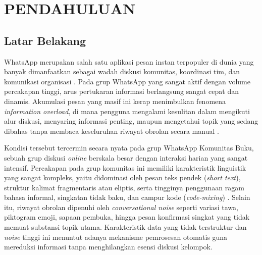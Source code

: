%

\chapter{PENDAHULUAN}

\section{Latar Belakang}
\label{sec:intro-background}

WhatsApp merupakan salah satu aplikasi pesan instan terpopuler di dunia yang banyak dimanfaatkan sebagai wadah diskusi komunitas, koordinasi tim, dan komunikasi organisasi \citep{WhatsAppAbout}.
Pada grup WhatsApp yang sangat aktif dengan volume percakapan tinggi, arus pertukaran informasi berlangsung sangat cepat dan dinamis.
Akumulasi pesan yang masif ini kerap menimbulkan fenomena \textit{information overload}, di mana pengguna mengalami kesulitan dalam mengikuti alur diskusi, menyaring informasi penting, maupun mengetahui topik yang sedang dibahas tanpa membaca keseluruhan riwayat obrolan secara manual \citep{rani2022whatsapp}.

Kondisi tersebut tercermin secara nyata pada grup WhatsApp Komunitas Buku, sebuah grup diskusi \textit{online} berskala besar dengan interaksi harian yang sangat intensif.
Percakapan pada grup komunitas ini memiliki karakteristik linguistik yang sangat kompleks, yaitu didominasi oleh pesan teks pendek (\textit{short text}), struktur kalimat fragmentaris atau eliptis, serta tingginya penggunaan ragam bahasa informal, singkatan tidak baku, dan campur kode (\textit{code-mixing}) \citep{10.1145/3507900,9243443,sutarma2017,siregar2025}.
Selain itu, riwayat obrolan dipenuhi oleh \textit{conversational noise} seperti variasi tawa, piktogram emoji, sapaan pembuka, hingga pesan konfirmasi singkat yang tidak memuat substansi topik utama.
Karakteristik data yang tidak terstruktur dan \textit{noise} tinggi ini menuntut adanya mekanisme pemrosesan otomatis guna mereduksi informasi tanpa menghilangkan esensi diskusi kelompok.

